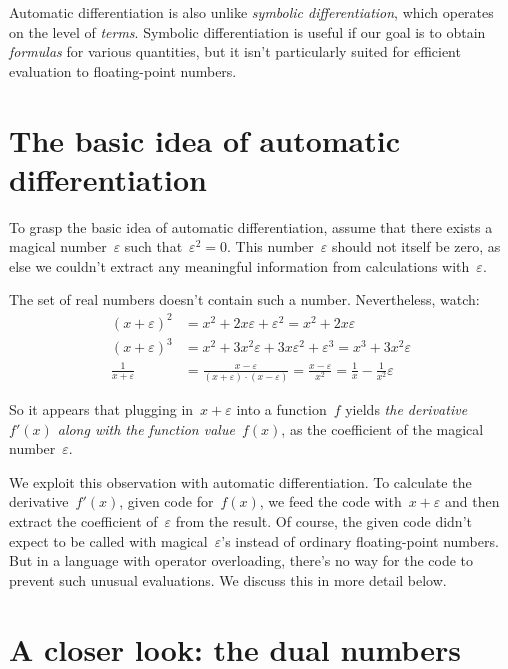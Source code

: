\documentclass[a4paper,ngerman,12pt]{scrartcl}
\theoremstyle{definition}
\theoremstyle{plain}
\theoremstyle{remark}
\begin{document}
Automatic differentiation is also unlike \emph{symbolic differentiation},
which operates on the level of \emph{terms}. Symbolic differentiation is useful
if our goal is to obtain \emph{formulas} for various quantities, but it isn't
particularly suited for efficient evaluation to floating-point numbers.


\section{The basic idea of automatic differentiation}

To grasp the basic idea of automatic differentiation, assume that there exists
a magical number~$\varepsilon$ such that~$\varepsilon^2 = 0$. This
number~$\varepsilon$ should not itself be zero, as else we couldn't extract any
meaningful information from calculations with~$\varepsilon$.

The set of real numbers doesn't contain such a number. Nevertheless, watch:
\begin{align*}
  (x+\varepsilon)^2 &= x^2 + 2x\varepsilon + \varepsilon^2 = x^2 + 2x\varepsilon \\[0.6em]
  (x+\varepsilon)^3 &= x^2 + 3x^2\varepsilon + 3x\varepsilon^2 + \varepsilon^3 = x^3 + 3x^2\varepsilon \\[0.6em]
  \frac{1}{x+\varepsilon} &= \frac{x-\varepsilon}{(x+\varepsilon) \cdot
  (x-\varepsilon)} = \frac{x-\varepsilon}{x^2} = \frac{1}{x} - \frac{1}{x^2}
  \varepsilon
\end{align*}

So it appears that plugging in~$x + \varepsilon$ into a function~$f$ yields
\emph{the derivative~$f'(x)$ along with the function value~$f(x)$}, as the
coefficient of the magical number~$\varepsilon$.

We exploit this observation with automatic differentiation. To calculate the
derivative~$f'(x)$, given code for~$f(x)$, we feed the code with~$x +
\varepsilon$ and then extract the coefficient of~$\varepsilon$ from the result.
Of course, the given code didn't expect to be called with
magical~$\varepsilon$'s instead of ordinary floating-point numbers. But in a
language with operator overloading, there's no way for the code to prevent such
unusual evaluations. We discuss this in more detail below.


\section{A closer look: the dual numbers}
\end{document}
